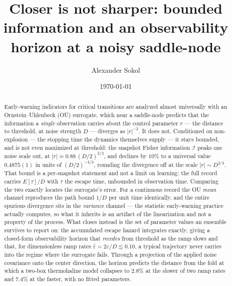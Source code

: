 \documentclass[%
 aip,
 cha,
 amsmath,amssymb,
 reprint,
 superscriptaddress,
 floatfix,
]{revtex4-2}
\newcommand{\Ifish}{\mathcal{I}}
\newcommand{\Sig}{\hat\varepsilon}
\begin{document}
\title{Closer is not sharper: bounded information and an
  observability horizon at a noisy saddle-node}

\author{Alexander Sokol}

\date{\today}

\begin{abstract}
Early-warning indicators for critical transitions are analyzed almost universally with an Ornstein--Uhlenbeck (OU) surrogate, which near a saddle-node predicts that the information a \emph{single} observation carries about the control parameter $r$ --- the distance to threshold, at noise strength $D$ --- diverges as $|r|^{-2}$.  It does not.  Conditioned on non-explosion --- the stopping time the dynamics themselves supply --- it stays bounded, and is not even maximized at threshold: the snapshot Fisher information $\Ifish$ peaks one noise scale out, at $|r|\simeq0.88\,(D/2)^{2/3}$, and declines by $10\%$ to a universal value $0.4875(1)$ in units of $(D/2)^{-4/3}$, rounding the divergence off at the scale $|r|\sim D^{2/3}$.  That bound is a per-snapshot statement and not a limit on learning: the full record carries $E[\tau]/D$ with $\tau$ the escape time, unbounded in observation time.  Comparing the two exactly locates the surrogate's error.  For a continuous record the OU \emph{mean} channel reproduces the path bound $1/D$ per unit time identically, and the entire spurious divergence sits in the \emph{variance} channel --- the statistic early-warning practice actually computes, so what it inherits is an artifact of the linearization and not a property of the process.  What closes instead is the set of parameter values an ensemble survives to report on: the accumulated escape hazard integrates exactly, giving a closed-form observability horizon that \emph{recedes} from threshold as the ramp slows and that, for dimensionless ramp rates $\Sig=2\varepsilon/D\lesssim0.10$, a typical trajectory never carries into the regime where the surrogate fails.  Through a projection of the applied noise covariance onto the center direction, the horizon predicts the distance from the fold at which a two-box thermohaline model collapses to $2.8\%$ at the slower of two ramp rates and $7.4\%$ at the faster, with no fitted parameters.
\end{abstract}

\end{document}
